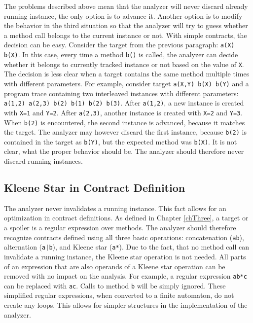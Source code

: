 The problems described above mean that the analyzer will never discard already
running instance, the only option is to advance it. Another option is to modify
the behavior in the third situation so that the analyzer will try to guess
whether a method call belongs to the current instance or not. With simple
contracts, the decision can be easy. Consider the target from the previous
paragraph: \texttt{a(X) b(X)}. In this case, every time a method \texttt{b()} is
called, the analyzer can decide whether it belongs to currently tracked instance
or not based on the value of \texttt{X}. The decision is less clear when a
target contains the same method multiple times with different parameters. For
example, consider target \texttt{a(X,Y) b(X) b(Y)} and a program trace
containing two interleaved instances with different parameters: \texttt{a(1,2)
a(2,3) b(2) b(1) b(2) b(3)}. After \texttt{a(1,2)}, a new instance is created
with \texttt{X=1} and \texttt{Y=2}. After \texttt{a(2,3)}, another instance is
created with \texttt{X=2} and \texttt{Y=3}. When \texttt{b(2)} is encountered,
the second instance is advanced, because it matches the target. The analyzer may
however discard the first instance, because \texttt{b(2)} is contained in the
target as \texttt{b(Y)}, but the expected method was \texttt{b(X)}. It is not
clear, what the proper behavior should be. The analyzer should therefore never
discard running instances.

\subsection{Kleene Star in Contract Definition}

The analyzer never invalidates a running instance. This fact allows for an
optimization in contract definitions. As defined in Chapter \ref{chThree}, a
target or a spoiler is a regular expression over methods. The analyzer should
therefore recognize contracts defined using all three basic operations:
concatenation (\texttt{ab}), alternation (\texttt{a|b}), and Kleene star
(\texttt{a*}). Due to the fact, that no method call can invalidate a running
instance, the Kleene star operation is not needed. All parts of an expression
that are also operands of a Kleene star operation can be removed with no impact
on the analysis. For example, a regular expression \texttt{ab*c} can be replaced
with \texttt{ac}. Calls to method \texttt{b} will be simply ignored. These
simplified regular expressions, when converted to a finite automaton, do not
create any loops. This allows for simpler structures in the implementation of
the analyzer.

